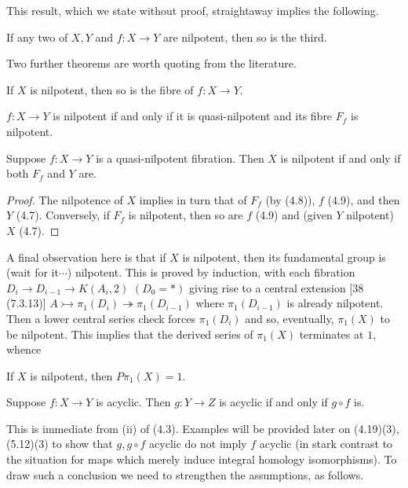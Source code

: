 This result, which we state without proof, straightaway implies the following.
\begin{corollary}
  If any two of $X, Y$ and $f \colon   X\longrightarrow Y$ are nilpotent, then so is the third.
\end{corollary}

Two further theorems are worth quoting from the literature.
\begin{theorem}
[11 (7.2)] If $X$ is nilpotent, then so is the fibre of $f \colon   X\longrightarrow Y$.
\end{theorem}
\begin{theorem}
[19 (2.2)] $f \colon   X\longrightarrow Y$ is nilpotent if and only if it is quasi-nilpotent and its fibre $F_f$ is nilpotent.
 \end{theorem} 
\begin{corollary}
   Suppose $f\colon   X \longrightarrow Y$ is a quasi-nilpotent fibration. Then $X$ is nilpotent if and only if both $F_f$ and $Y$ are.
\end{corollary}
\begin{proof}
The nilpotence of $X$ implies in turn that of $F_f$ (by (4.8)), $f$ (4.9), and then $Y$ (4.7). Conversely, if $F_f$ is nilpotent, then so are $f$ (4.9) and (given $Y$ nilpotent) $X$ (4.7).
\end{proof}

A final observation here is that if $X$ is nilpotent, then its fundamental group is (wait for it$\cdots$) nilpotent. This is proved by induction, with each fibration $D_i\longrightarrow D_{i-1} \longrightarrow K(A_i, 2)$ $(D_0 = *)$ giving rise to a central extension [38 (7.3.13)] $A \rightarrowtail \pi_1(D_i) \twoheadrightarrow \pi_1(D_{i-1})$ where $\pi_1(D_{i-1})$ is
already nilpotent. Then a lower central series check forces $\pi_1(D_{i})$ and so, eventually, $\pi_1(X)$ to be nilpotent. This implies that the derived series of $\pi_1(X)$ terminates at $1$, whence
\begin{prop}
  If $X$ is nilpotent, then $P\pi_1(X)= 1$.
\end{prop}
\begin{prop}
  Suppose $f\colon   X \longrightarrow Y$ is acyclic. Then $g \colon   Y \longrightarrow Z$ is acyclic if and only if $g\circ f$ is.
 \end{prop} 
This is immediate from (ii) of (4.3). Examples will be provided later on (4.19)(3),
(5.12)(3) to show that $g, g\circ f$ acyclic do not imply $f$ acyclic (in stark contrast to the situation for maps which merely induce integral homology isomorphisms). To draw such a conclusion we need to strengthen the assumptions, as follows.

